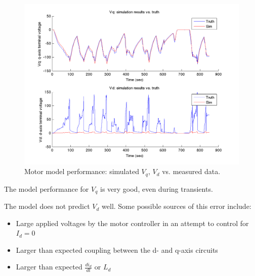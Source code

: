 \documentclass[../SimBALink.tex]{subfiles}
\begin{document}
		\begin{figure}[h]
			\centering
			\includegraphics[width=\linewidth]{Vq_Vd}
			\caption{Motor model performance: simulated $V_q$, $V_d$ vs. measured data.}
		\end{figure}
		\FloatBarrier
		
		The model performance for $V_q$ is very good, even during transients. 
		
		The model does not predict $V_d$ well. Some possible sources of this error include:
		
		\begin{itemize}
			\item		Large applied voltages by the motor controller in an attempt to control for $I_d = 0$
			\item		Larger than expected coupling between the d- and q-axis circuits
			\item		Larger than expected $\frac{d i_d}{d t}$ or $L_d$
		\end{itemize}
		
		
\end{document}
